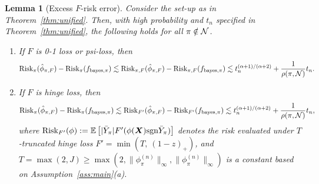 \documentclass[11pt]{article}
\theoremstyle{plain}
\newtheorem{lem}{Lemma}
\theoremstyle{definition}
\def\sign{\textup{sgn}}
\def\bayespif{f_{\textup{bayes},\pi}}
\def\risk{\textup{Risk}_\pi}
\def\shift{\bar Y_\pi}
\def\riskF{\textup{Risk}_{\pi,F}}
\begin{document}
\begin{lem}[Excess $F$-risk error]\label{lem:risk}Consider the set-up as in Theorem~\ref{thm:unified}. Then, with high probability and $t_n$ specified in Theorem~\ref{thm:unified}, the following holds for all $\pi\notin\mathcal{N}$. 
\begin{enumerate}[label={2.\arabic*},wide, labelwidth=!, labelindent=0pt]
\item[(a)] If $F$ is 0-1 loss or psi-loss, then
\[
\risk(\hat \phi_{\pi,F})-\risk(\bayespif)\lesssim \riskF(\hat \phi_{\pi,F})-\riskF(\bayespif) \lesssim t_n^{(\alpha+1)/(\alpha+2)}+ {1\over \rho(\pi,\tN)}t_n.
\]
\item[(b)] If $F$ is hinge loss, then
\[
\risk(\hat \phi_{\pi,F})-\risk(\bayespif)\lesssim \textup{Risk}_{F'}(\hat \phi_{\pi,F})-\textup{Risk}_{F'}(\bayespif) \lesssim t_n^{(\alpha+1)/(\alpha+2)}+ {1\over \rho(\pi,\tN)}t_n,
\]
where $\text{Risk}_{F'}(\phi):=\mathbb{E}\left[|\shift|F'( \phi(\mX)\sign\shift)\right]$ denotes the risk evaluated under $T$-truncated hinge loss $F'=\min(T,\ (1-z)_{+})$, and $T=\max(2,J) \geq \max(2, \|{\phi_\pi^{(n)}}\|_{\infty}, \|{\phi_\pi^{(n)}}\|_{\infty})$ is a constant based on Assumption~\ref{ass:main}(a). 
\end{enumerate}
\end{lem}
\end{document}
